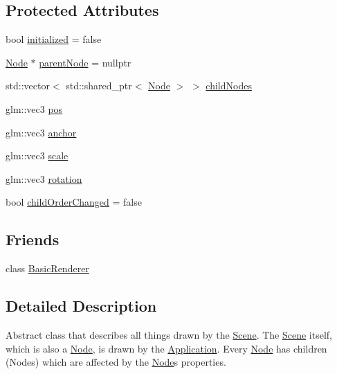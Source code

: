\subsection*{Protected Attributes}
\begin{DoxyCompactItemize}
\item 
bool \mbox{\hyperlink{classsage_1_1Node_a2c2cf2d54ee6a9368ece7ea46ad13deb}{initialized}} = false
\item 
\mbox{\hyperlink{classsage_1_1Node}{Node}} $\ast$ \mbox{\hyperlink{classsage_1_1Node_a9f6d79896df762b8e8cff9574f1e9262}{parent\+Node}} = nullptr
\item 
std\+::vector$<$ std\+::shared\+\_\+ptr$<$ \mbox{\hyperlink{classsage_1_1Node}{Node}} $>$ $>$ \mbox{\hyperlink{classsage_1_1Node_a57b2d8693ad5b47016297be7a4c4e8c6}{child\+Nodes}}
\item 
glm\+::vec3 \mbox{\hyperlink{classsage_1_1Node_a26c32e5ec11e0ed7f33053ecac6830d5}{pos}}
\item 
glm\+::vec3 \mbox{\hyperlink{classsage_1_1Node_a8698d732514fa2caba0ccee46dbae17a}{anchor}}
\item 
glm\+::vec3 \mbox{\hyperlink{classsage_1_1Node_a686c3edeea1faab8b566bfdf2fe3f906}{scale}}
\item 
glm\+::vec3 \mbox{\hyperlink{classsage_1_1Node_a7f338279775e186e48336145a5d69241}{rotation}}
\item 
bool \mbox{\hyperlink{classsage_1_1Node_af78e7de5e455b1c64036f09a8889f51d}{child\+Order\+Changed}} = false
\end{DoxyCompactItemize}
\subsection*{Friends}
\begin{DoxyCompactItemize}
\item 
class \mbox{\hyperlink{classsage_1_1Node_a2e3d7a9693f494564454ce2b99aa59ab}{Basic\+Renderer}}
\end{DoxyCompactItemize}


\subsection{Detailed Description}
Abstract class that describes all things drawn by the \mbox{\hyperlink{classsage_1_1Scene}{Scene}}. The \mbox{\hyperlink{classsage_1_1Scene}{Scene}} itself, which is also a \mbox{\hyperlink{classsage_1_1Node}{Node}}, is drawn by the \mbox{\hyperlink{classsage_1_1Application}{Application}}. Every \mbox{\hyperlink{classsage_1_1Node}{Node}} has children (Nodes) which are affected by the \mbox{\hyperlink{classsage_1_1Node}{Node}}\textquotesingle{}s properties. 

